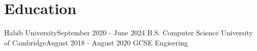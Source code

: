\section{Education}
  \resumeSubHeadingListStart
    \resumeSubheading
      {Habib University}{September 2020 - June 2024}
      {B.S. Computer Science}{}
    \resumeSubheading
    {University of Cambridge}{August 2018 - August 2020}
    {GCSE Engieering}{}
      \resumeSubHeadingListEnd
